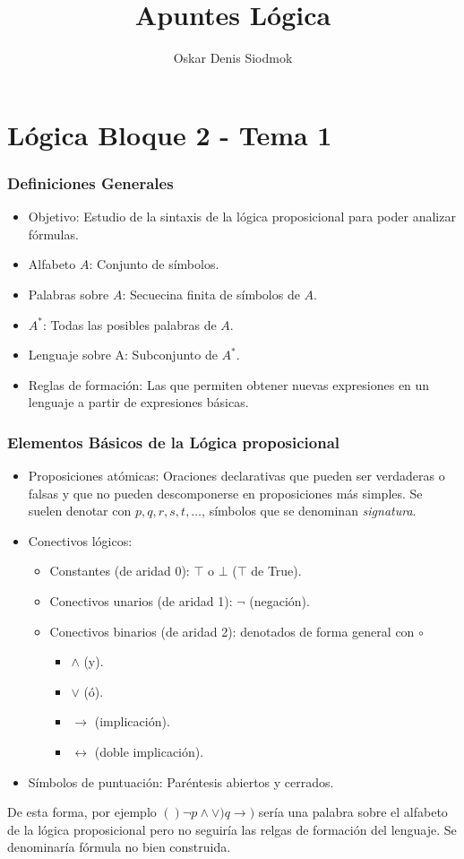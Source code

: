 \documentclass[10pt,a4paper]{article}
\title{Apuntes Lógica}
\author{Oskar Denis Siodmok}
\begin{document}
\maketitle
\part{Lógica Bloque 2 - Tema 1}
\section{Definiciones Generales}
\begin{itemize}
\item Objetivo: Estudio de la sintaxis de la lógica proposicional para poder analizar fórmulas.
\item Alfabeto $A$: Conjunto de símbolos.
\item Palabras sobre $A$: Secuecina finita de símbolos de $A$.
\item $A^*$: Todas las posibles palabras de $A$.
\item Lenguaje sobre A: Subconjunto de $A^*$.
\item Reglas de formación: Las que permiten obtener nuevas expresiones en un lenguaje a partir de expresiones básicas.
\end{itemize}

\section{Elementos Básicos de la Lógica proposicional}
\begin{itemize}
	\item Proposiciones atómicas: Oraciones declarativas que pueden ser verdaderas o falsas y que no pueden descomponerse en proposiciones más simples. Se suelen denotar con $p,q,r,s,t,\dots$, símbolos que se denominan \textit{signatura}.
	\item Conectivos lógicos:
		\begin{itemize}
			\item Constantes (de aridad 0): $\top$ o $\bot$ ($\top$ de True).
			\item Conectivos unarios (de aridad 1): $\neg$ (negación).
			\item Conectivos binarios (de aridad 2): denotados de forma general con $\circ$
				\begin{itemize}
					\item $\land$ (y).
					\item $\lor$ (ó).
					\item $\rightarrow$ (implicación).
					\item $\leftrightarrow$ (doble implicación).
				\end{itemize}
		\end{itemize}
	\item Símbolos de puntuación: Paréntesis abiertos y cerrados.
\end{itemize}
De esta forma, por ejemplo $()\neg p\land\lor )q\rightarrow)$ sería una palabra sobre el alfabeto de la lógica proposicional pero no seguiría las relgas de formación del lenguaje. Se denominaría fórmula no bien construida.
\end{document}
